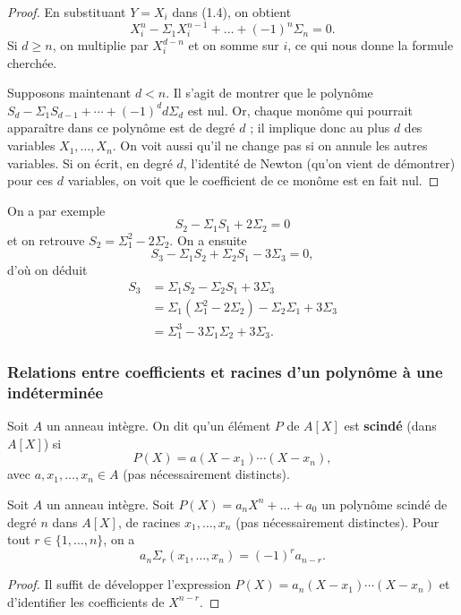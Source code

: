 \documentclass[]{report}
\begin{document}
\begin{proof}
    En substituant $Y = X_i$ dans (1.4), on obtient
    \[X_i^n - \Sigma_1 X_i^{n-1} + \dots + (-1)^n \Sigma_n = 0.\]
    Si $d \ge n$, on multiplie par $X_i^{d-n}$ et on somme sur $i$, ce qui nous donne la formule cherchée.

    Supposons maintenant $d < n$. Il s'agit de montrer que le polynôme $S_d - \Sigma_1 S_{d-1} + \cdots + (-1)^d d \Sigma_d$ est nul. Or, chaque monôme qui pourrait apparaître dans ce polynôme est de degré $d$ ; il implique donc au plus $d$ des variables $X_1, \ldots, X_n$. On voit aussi qu'il ne change pas si on annule les autres variables. Si on écrit, en degré $d$, l'identité de Newton (qu'on vient de démontrer) pour ces $d$ variables, on voit que le coefficient de ce monôme est en fait nul.
\end{proof}

On a par exemple
\[S_2 - \Sigma_1 S_1 + 2\Sigma_2 = 0\]
et on retrouve $S_2 = \Sigma_1^2 - 2\Sigma_2$. On a ensuite
\[S_3 - \Sigma_1 S_2 + \Sigma_2 S_1 - 3\Sigma_3 = 0,\]
d'où on déduit
\begin{align*}
S_3 & = \Sigma_1 S_2 - \Sigma_2 S_1 + 3\Sigma_3\\
& = \Sigma_1(\Sigma_1^2 - 2\Sigma_2) - \Sigma_2 \Sigma_1 + 3\Sigma_3\\
& = \Sigma_1^3 - 3\Sigma_1 \Sigma_2 + 3\Sigma_3.
\end{align*}

\subsubsection{Relations entre coefficients et racines d'un polynôme à une indéterminée}

Soit $A$ un anneau intègre. On dit qu'un élément $P$ de $A[X]$ est \textbf{scindé} (dans $A[X]$) si
\[P(X) = a(X - x_1) \cdots (X - x_n),\]
avec $a, x_1, \dots, x_n \in A$ (pas nécessairement distincts).

\begin{prop}{}{}
    Soit $A$ un anneau intègre. Soit $P(X) = a_n X^n + \dots + a_0$ un polynôme scindé de degré $n$ dans $A[X]$, de racines $x_1, \dots, x_n$ (pas nécessairement distinctes). Pour tout $r \in \{1, \dots, n\}$, on a
    \[a_n \Sigma_r(x_1, \dots, x_n) = (-1)^r a_{n-r}.\]
\end{prop}

\begin{proof}
    Il suffit de développer l'expression $P(X) = a_n(X - x_1) \cdots (X - x_n)$ et d'identifier les coefficients de $X^{n-r}$.
\end{proof}
\end{document}

